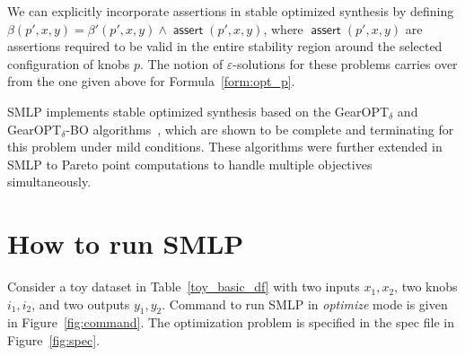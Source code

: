 \documentclass[a4paper,parskip=half]{article} %
\newcommand*\eqdef=
\newcommand*\assert{\operatorname{\mathsf{assert}}}
\newcommand*\todofb[2][]{\todo[color=cyan!30,tickmarkheight=.2em,size=\scriptsize,#1]{FB: #2}}
\begin{document}
We can explicitly incorporate assertions in stable optimized synthesis by defining $\beta(p',x,y)\eqdef \beta'(p',x,y) \wedge \assert(p',x,y)$, where  $\assert(p',x,y)$ are assertions required to be valid in the entire stability region around the selected configuration of knobs $p$.
The notion of $\varepsilon$-solutions for these problems carries over from the one given above for Formula~\eqref{form:opt_p}.

SMLP implements stable optimized synthesis based on the GearOPT$_\delta$ and GearOPT$_\delta$-BO algorithms~\cite{DBLP:conf/fmcad/BrausseKK20,DBLP:conf/ijcai/BrausseKK22}, which are shown to be complete and terminating 
for this problem under mild conditions. 
%
These algorithms were further extended in SMLP to Pareto point computations to handle multiple objectives simultaneously.





\section{How to run SMLP}\label{sec:run}


Consider a toy dataset in Table~\cref{toy_basic_df} with two inputs $x_1, x_2$, two knobs $i_1, i_2$, and two outputs $y_1, y_2$.
Command to run SMLP in \emph{optimize} mode is given in Figure~\cref{fig:command}.
The optimization problem is specified in the spec file in Figure~\cref{fig:spec}.
\end{document}
